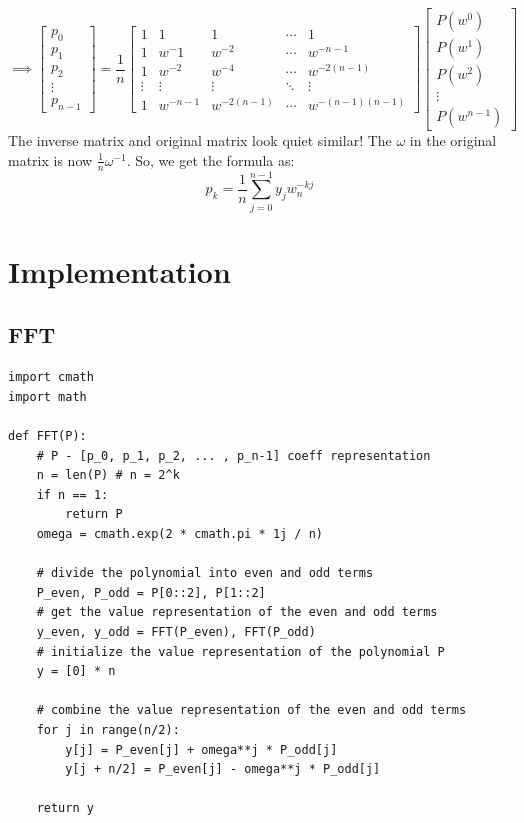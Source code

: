 \documentclass[28]{report}
\begin{document}
\begin{equation*}
\implies 
    \begin{bmatrix}
        p_0 \\
        p_1 \\
        p_2 \\
        \vdots \\
        p_{n-1}
    \end{bmatrix}
    = 
    \frac{1}{n}
  \begin{bmatrix} 
  1     & 1     & 1     & \cdots & 1    \\ 
  1     & w^-1     & w^{-2}   & \cdots & w^{-n-1} \\ 
  1     & w^{-2}   & w^{-4}   & \cdots & w^{-2(n-1)} \\
  \vdots & \vdots & \vdots  & \ddots & \vdots \\
  1 & w^{-n-1} & w^{-2(n-1)}  & \cdots & w^{-(n-1)(n-1)} 
\end{bmatrix} 
    \begin{bmatrix}
    P(w^0) \\
    P(w^1) \\
    P(w^2) \\
    \vdots \\
    P(w^{n-1})
  \end{bmatrix}     
\end{equation*}
The inverse matrix and original matrix look quiet similar! The $\omega$ in the original matrix is now $\frac{1}{n} \omega^{-1}$.
So, we get the formula as: 
$$p_k = \frac{1}{n} \sum_{j=0}^{n-1} y_j w_n^{-k j}$$




\chapter{Implementation}
\section{FFT}
\begin{verbatim}
import cmath
import math

def FFT(P):
	# P - [p_0, p_1, p_2, ... , p_n-1] coeff representation
	n = len(P) # n = 2^k
	if n == 1:
		return P
	omega = cmath.exp(2 * cmath.pi * 1j / n)

	# divide the polynomial into even and odd terms
	P_even, P_odd = P[0::2], P[1::2]
	# get the value representation of the even and odd terms
	y_even, y_odd = FFT(P_even), FFT(P_odd)
	# initialize the value representation of the polynomial P
	y = [0] * n

	# combine the value representation of the even and odd terms
	for j in range(n/2):
		y[j] = P_even[j] + omega**j * P_odd[j]
		y[j + n/2] = P_even[j] - omega**j * P_odd[j]

	return y
\end{verbatim}
\end{document}
